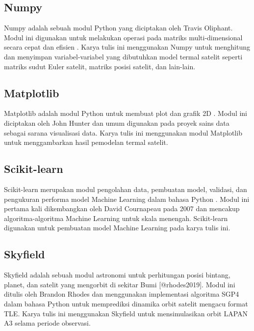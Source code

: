 \subsection{Numpy}

Numpy adalah sebuah modul Python yang diciptakan oleh Travis Oliphant. Modul
ini digunakan untuk melakukan operasi pada matriks multi-dimensional secara
cepat dan efisien \cite{harris2020}. Karya tulis ini menggunakan Numpy untuk
menghitung dan menyimpan variabel-variabel yang dibutuhkan model termal satelit
seperti matriks sudut Euler satelit, matriks posisi satelit, dan lain-lain. 

\subsection{Matplotlib}

Matplotlib adalah modul Python untuk membuat plot dan grafik 2D \cite{hunter2007}.
Modul ini diciptakan oleh John Hunter dan umum digunakan pada proyek sains data
sebagai sarana visualisasi data. Karya tulis ini menggunakan modul Matplotlib
untuk menggambarkan hasil pemodelan termal satelit.

\subsection{Scikit-learn}

Scikit-learn merupakan modul pengolahan data, pembuatan model, validasi, dan
pengukuran performa model Machine Learning dalam bahasa Python \cite{pedregosa2011}.
Modul ini pertama kali dikembangkan oleh David Cournapeau pada 2007 dan
mencakup algoritma-algoritma Machine Learning untuk skala menengah.
Scikit-learn digunakan untuk pembuatan model Machine Learning pada karya tulis
ini.

\subsection{Skyfield}

Skyfield adalah sebuah modul astronomi untuk perhitungan posisi bintang,
planet, dan satelit yang mengorbit di sekitar Bumi [@rhodes2019]. Modul ini
ditulis oleh Brandon Rhodes dan menggunakan implementasi algoritma SGP4 dalam
bahasa Python \cite{rodriguez} untuk memprediksi dinamika orbit satelit mengacu
format TLE. Karya tulis ini menggunakan Skyfield untuk
mensimulasikan orbit LAPAN A3 selama periode observasi.
